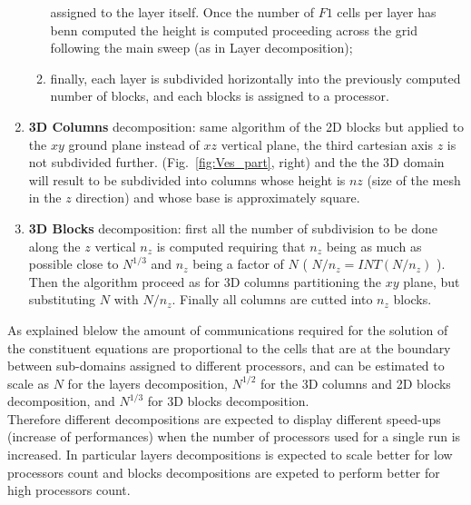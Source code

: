 \begin{enumerate}
\begin{enumerate}
assigned to the layer itself. 
Once the number of $F1$ cells per layer has benn computed the height is computed 
proceeding across the grid following the main sweep (as in Layer decomposition);
\item finally, each layer is subdivided horizontally into the previously computed number
of blocks, and each blocks is assigned to a processor. 
\end{enumerate}
\item {\bf 3D Columns } decomposition: same algorithm of the 2D blocks but applied to the $xy$ 
ground plane instead of $xz$ vertical plane, the third cartesian axis $z$ is not subdivided
further. (Fig.~\ref{fig:Ves_part}, right) and the the 3D domain will result to be subdivided
into columns whose height is $nz$ (size of the mesh in the $z$ direction) and whose base
is approximately square.
\item {\bf 3D Blocks} decomposition: first all the number of subdivision to be done
along the $z$ vertical $n_z$ is computed requiring that $n_z$ being as much as possible
close to $N^{1/3}$ and $n_z$ being a factor of $N$ ( $N/n_z = INT(N/n_z)$ ).
Then the algorithm proceed as for 3D columns partitioning the $xy$ plane, 
but substituting $N$ with $N/n_z$. Finally all columns are cutted into $n_z$ blocks.
\end{enumerate}

As explained blelow the amount of communications required for the solution 
of the constituent equations
are proportional to the cells that are at the boundary between sub-domains assigned to
different processors, and can be estimated to scale as $N$ for the layers decomposition, 
$N^{1/2}$ for the 3D columns
and 2D blocks decomposition, and $N^{1/3}$ for 3D blocks decomposition.\\
Therefore different decompositions are expected to display different speed-ups
(increase of performances) when the number of processors used for a single run
is increased. In particular layers decompositions is expected to scale better
for low processors count and blocks decompositions are expeted to perform 
better for high processors count.

